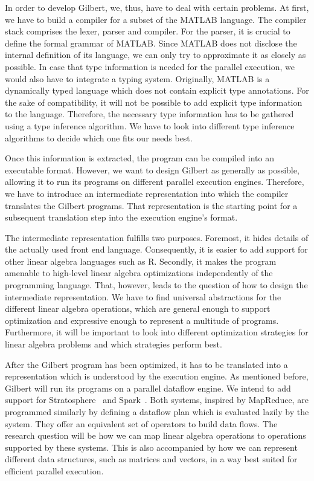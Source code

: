 In order to develop Gilbert, we, thus, have to deal with certain problems.
At first, we have to build a compiler for a subset of the MATLAB language.
The compiler stack comprises the lexer, parser and compiler.
For the parser, it is crucial to define the formal grammar of MATLAB.
Since MATLAB does not disclose the internal definition of its language, we can only try to approximate it as closely as possible.
In case that type information is needed for the parallel execution, we would also have to integrate a typing system.
Originally, MATLAB is a dynamically typed language which does not contain explicit type annotations.
For the sake of compatibility, it will not be possible to add explicit type information to the language.
Therefore, the necessary type information has to be gathered using a type inference algorithm.
We have to look into different type inference algorithms to decide which one fits our needs best.

Once this information is extracted, the program can be compiled into an executable format.
However, we want to design Gilbert as generally as possible, allowing it to run its programs on different parallel execution engines.
Therefore, we have to introduce an intermediate representation into which the compiler translates the Gilbert programs.
That representation is the starting point for a subsequent translation step into the execution engine's format.

The intermediate representation fulfills two purposes.
Foremost, it hides details of the actually used front end language.
Consequently, it is easier to add support for other linear algebra languages such as R.
Secondly, it makes the program amenable to high-level linear algebra optimizations independently of the programming language.
That, however, leads to the question of how to design the intermediate representation.
We have to find universal abstractions for the different linear algebra operations, which are general enough to support optimization and expressive enough to represent a multitude of programs.
Furthermore, it will be important to look into different optimization strategies for linear algebra problems and which strategies perform best.

After the Gilbert program has been optimized, it has to be translated into a representation which is understood by the execution engine.
As mentioned before, Gilbert will run its programs on a parallel dataflow engine.
We intend to add support for Stratosphere~\cite{alexandrov:2011a} and Spark~\cite{zaharia:2010a}.
Both systems, inspired by MapReduce, are programmed similarly by defining a dataflow plan which is evaluated lazily by the system.
They offer an equivalent set of operators to build data flows.
The research question will be how we can map linear algebra operations to operations supported by these systems.
This is also accompanied by how we can represent different data structures, such as matrices and vectors, in a way best suited for efficient parallel execution.

